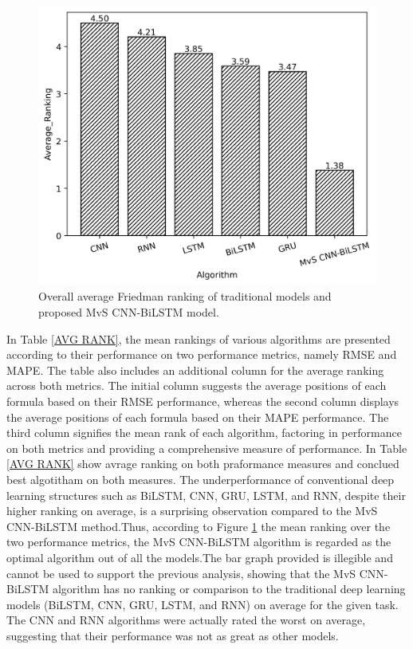 \documentclass[a4paper,fleqn]{cas-sc}
\begin{document}
  \begin{figure}[h!]
    \centering
    \includegraphics[scale=0.7]{img/avg_Rank_plot}
    \caption{Overall average Friedman ranking of traditional models and proposed MvS CNN-BiLSTM model.}
    \label{avg_Rank_plot}
  \end{figure}
  In Table \ref{AVG RANK}, the mean rankings of various algorithms are presented according to their performance on two performance metrics, namely RMSE and MAPE. The table also includes an additional column for the average ranking across both metrics. The initial column suggests the average positions of each formula based on their RMSE performance, whereas the second column displays the average positions of each formula based on their MAPE performance. The third column signifies the mean rank of each algorithm, factoring in performance on both metrics and providing a comprehensive measure of performance. In Table \ref{AVG RANK} show avrage ranking on both praformance measures and conclued best algotitham on both measures. The underperformance of conventional deep learning structures such as BiLSTM, CNN, GRU, LSTM, and RNN, despite their higher ranking on average, is a surprising observation compared to the MvS CNN-BiLSTM method.Thus, according to Figure \ref{avg_Rank_plot} the mean ranking over the two performance metrics, the MvS CNN-BiLSTM algorithm is regarded as the optimal algorithm out of all the models.The bar graph provided is illegible and cannot be used to support the previous analysis, showing that the MvS CNN-BiLSTM algorithm has no ranking or comparison to the traditional deep learning models (BiLSTM, CNN, GRU, LSTM, and RNN) on average for the given task. The CNN and RNN algorithms were actually rated the worst on average, suggesting that their performance was not as great as other models.
\end{document}
